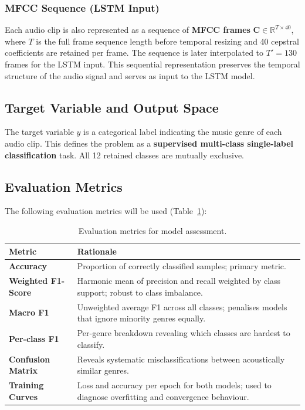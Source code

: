 \documentclass[12pt, a4paper]{article}
\begin{document}
\subsubsection{MFCC Sequence (LSTM Input)}

Each audio clip is also represented as a sequence of \textbf{MFCC frames} $\mathbf{C}
\in \mathbb{R}^{T \times 40}$, where $T$ is the full frame sequence length before
temporal resizing and 40 cepstral coefficients are retained per frame. The sequence is
later interpolated to $T'=130$ frames for the LSTM input. This sequential representation
preserves the temporal structure of the audio signal and serves as input to the LSTM
model.

\subsection{Target Variable and Output Space}

The target variable $y$ is a categorical label indicating the music genre of each audio
clip. This defines the problem as a \textbf{supervised multi-class single-label
classification} task. All 12 retained classes are mutually exclusive.

\subsection{Evaluation Metrics}

The following evaluation metrics will be used (Table~\ref{tab:metrics}):

\begin{table}[h!]
    \centering
    \caption{Evaluation metrics for model assessment.}
    \label{tab:metrics}
    \begin{tabular}{>{\bfseries}p{4cm} p{9cm}}
        \toprule
        Metric & Rationale \\
        \midrule
        Accuracy & Proportion of correctly classified samples; primary metric. \\[4pt]
        Weighted F1-Score & Harmonic mean of precision and recall weighted by class
                            support; robust to class imbalance. \\[4pt]
        Macro F1 & Unweighted average F1 across all classes; penalises models that
                   ignore minority genres equally. \\[4pt]
        Per-class F1 & Per-genre breakdown revealing which classes are hardest to
                       classify. \\[4pt]
        Confusion Matrix & Reveals systematic misclassifications between acoustically
                           similar genres. \\[4pt]
        Training Curves & Loss and accuracy per epoch for both models; used to diagnose
                          overfitting and convergence behaviour. \\
        \bottomrule
    \end{tabular}
\end{table}
\end{document}
